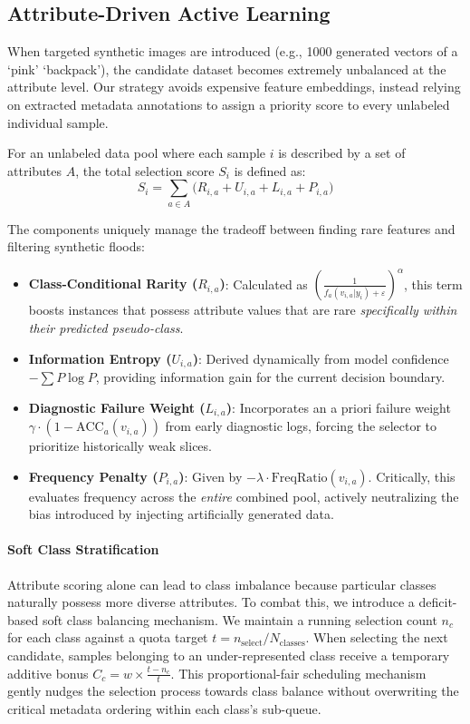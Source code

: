 \documentclass{article}
\begin{document}
\subsection{Attribute-Driven Active Learning}

When targeted synthetic images are introduced (e.g., 1000 generated vectors of a `pink' `backpack'), the candidate dataset becomes extremely unbalanced at the attribute level. Our strategy avoids expensive feature embeddings, instead relying on extracted metadata annotations to assign a priority score to every unlabeled individual sample.

For an unlabeled data pool where each sample $i$ is described by a set of attributes $A$, the total selection score $S_i$ is defined as:
\begin{equation}
S_i = \sum_{a \in A} \big( R_{i,a} + U_{i,a} + L_{i,a} + P_{i,a} \big)
\end{equation}

The components uniquely manage the tradeoff between finding rare features and filtering synthetic floods:
\begin{itemize}
    \item \textbf{Class-Conditional Rarity ($R_{i,a}$)}: Calculated as $\left( \frac{1}{f_{a}(v_{i,a} | y_i) + \varepsilon} \right)^{\alpha}$, this term boosts instances that possess attribute values that are rare \textit{specifically within their predicted pseudo-class}.
    \item \textbf{Information Entropy ($U_{i,a}$)}: Derived dynamically from model confidence $-\sum P \log P$, providing information gain for the current decision boundary.
    \item \textbf{Diagnostic Failure Weight ($L_{i,a}$)}: Incorporates an a priori failure weight $\gamma \cdot (1 - \text{ACC}_{a}(v_{i,a}))$ from early diagnostic logs, forcing the selector to prioritize historically weak slices.
    \item \textbf{Frequency Penalty ($P_{i,a}$)}: Given by $-\lambda \cdot \text{FreqRatio}(v_{i,a})$. Critically, this evaluates frequency across the \textit{entire} combined pool, actively neutralizing the bias introduced by injecting artificially generated data.
\end{itemize}

\paragraph{Soft Class Stratification}
Attribute scoring alone can lead to class imbalance because particular classes naturally possess more diverse attributes. To combat this, we introduce a deficit-based soft class balancing mechanism. We maintain a running selection count $n_c$ for each class against a quota target $t = n_{\text{select}} / N_{\text{classes}}$. When selecting the next candidate, samples belonging to an under-represented class receive a temporary additive bonus $C_{c} = w \times \frac{t - n_c}{t}$. This proportional-fair scheduling mechanism gently nudges the selection process towards class balance without overwriting the critical metadata ordering within each class's sub-queue.
\end{document}
